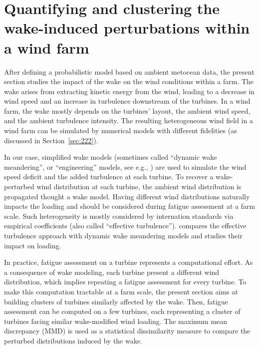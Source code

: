 \section{Quantifying and clustering the wake-induced perturbations within a wind farm}

After defining a probabilistic model based on ambient metocean data, the present section studies the impact of the wake on the wind conditions within a farm. 
The wake arises from extracting kinetic energy from the wind, leading to a decrease in wind speed and an increase in turbulence downstream of the turbines. 
In a wind farm, the wake mostly depends on the turbines' layout, the ambient wind speed, and the ambient turbulence intensity. 
The resulting heterogeneous wind field in a wind farm can be simulated by numerical models with different fidelities (as discussed in Section~\ref{sec:222}). 

In our case, simplified wake models (sometimes called ``dynamic wake meandering'', or ``engineering'' models, see e.g., \citealp{doubrawa_2020_benchmark}) are used to simulate the wind speed deficit and the added turbulence at each turbine.
To recover a wake-perturbed wind distribution at each turbine, the ambient wind distribution is propagated thought a wake model. 
Having different wind distributions naturally impacts the loading and should be considered during fatigue assessment at a farm scale. 
Such heterogeneity is mostly considered by internation standards via empirical coefficients (also called ``effective turbulence''). 
\citet{doubrawa_2023} compares the effective turbulence approach with dynamic wake meandering models and studies their impact on loading. 

In practice, fatigue assessment on a turbine represents a computational effort. 
As a consequence of wake modeling, each turbine present a different wind distribution, which implies repeating a fatigue assessment for every turbine. 
To make this computation tractable at a farm scale, the present section aims at building clusters of turbines similarly affected by the wake. 
Then, fatigue assessment can be computed on a few turbines, each representing a cluster of turbines facing similar wake-modified wind loading. 
The maximum mean discrepancy (MMD) is used as a statistical dissimilarity measure to compare the perturbed distributions induced by the wake. 

